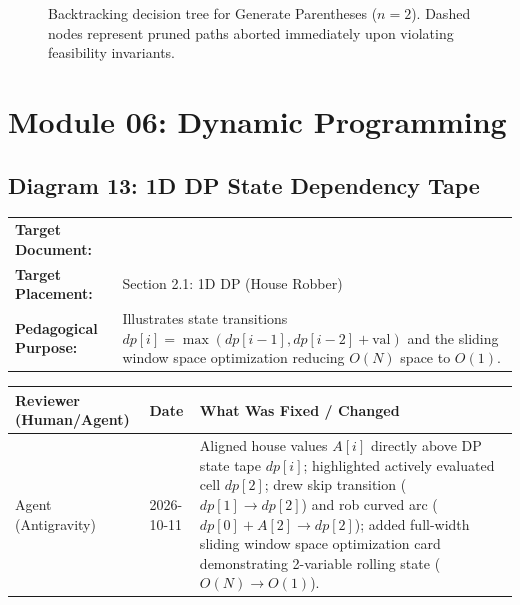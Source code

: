 \documentclass[11pt,a4paper]{article}
\newcommand{\breadcrumb}[3]{
    \par\vspace{0.15cm}
    \noindent\begin{tabularx}{\textwidth}{|l|X|}
    \hline
    \textbf{Target Document:} & \texttt{\detokenize{#1}} \\
    \textbf{Target Placement:} & #2 \\
    \textbf{Pedagogical Purpose:} & #3 \\
    \hline
    \end{tabularx}
    \vspace{0.15cm}\par
}
\newcommand{\diagramaudit}[3]{
    \par\vspace{0.12cm}
    \noindent\begin{tabularx}{\textwidth}{|l|l|>{\raggedright\arraybackslash}X|}
    \hline
    \textbf{Reviewer (Human/Agent)} & \textbf{Date} & \textbf{What Was Fixed / Changed} \\ \hline
    #1 & #2 & #3 \\ \hline
    \end{tabularx}
    \vspace{0.12cm}\par
}
\begin{document}
\begin{figure}[htbp]
\caption{Backtracking decision tree for Generate Parentheses ($n=2$). Dashed nodes represent pruned paths aborted immediately upon violating feasibility invariants.}
\end{figure}

\newpage
\section{Module 06: Dynamic Programming}

\subsection{Diagram 13: 1D DP State Dependency Tape}

\breadcrumb{06.dynamic_programming.tex}{Section 2.1: 1D DP (House Robber)}{Illustrates state transitions $dp[i] = \max(dp[i-1], dp[i-2] + \text{val})$ and the sliding window space optimization reducing $O(N)$ space to $O(1)$.}

\diagramaudit{Agent (Antigravity)}{2026-10-11}{Aligned house values $A[i]$ directly above DP state tape $dp[i]$; highlighted actively evaluated cell $dp[2]$; drew skip transition ($dp[1] \to dp[2]$) and rob curved arc ($dp[0] + A[2] \to dp[2]$); added full-width sliding window space optimization card demonstrating 2-variable rolling state ($O(N) \to O(1)$).}
\end{document}
